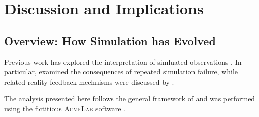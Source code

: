 \chapteropen
\chapter{Discussion and Implications}
\label{ch:discussion}
\hypertarget{ch:discussion}{}
\glsresetall
\quoteFive

\section{Overview: How Simulation has Evolved}

Previous work has explored the interpretation of simluated observations
\citep{scholar2022methods, mentor2023methods}. In particular,
\citet{example2024analysis} examined the consequences of repeated simulation
failure, while related reality feedback mechnisms were discussed by
\citet{researcher2025observations}.

The analysis presented here follows the general framework of
\citet{researcher2026observations} and was performed using the fictitious
\textsc{AcmeLab} software \citep{taylor2021dissertation}.